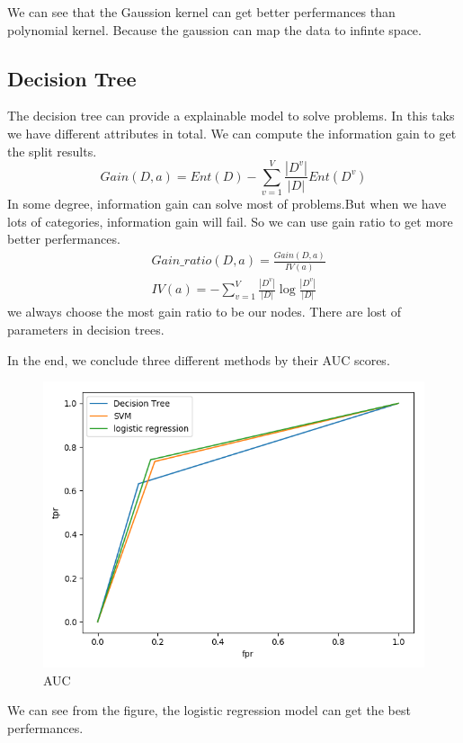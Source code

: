 We can see that the Gaussion kernel can get better perfermances than polynomial kernel. Because the gaussion can map the data to infinte space.

\subsection{Decision Tree}
The decision tree can provide a explainable model to solve problems. In this taks we have different attributes in total. We can compute the information gain to get the split results.
\begin{equation}
    Gain(D, a) = Ent(D) - \sum_{v=1}^{V} \frac{|D^v|}{|D|} Ent(D^v)
\end{equation}
In some degree, information gain can solve most of problems.But when we have lots of categories, information gain will fail. So we can use gain ratio to get more better perfermances.
\begin{align}
    &Gain\_ratio(D, a) = \frac{Gain(D,a)}{IV(a)}\\
    &IV(a) = -\sum_{v=1}^{V} \frac{|D^v|}{|D|} \log\frac{|D^v|}{|D|}
\end{align}
we always choose the most gain ratio to be our nodes. There are lost of parameters in decision trees.

In the end, we conclude three different  methods by their AUC scores.
\begin{figure}[ht]
    \centering
    \includegraphics[width=1\linewidth]{img/myplot.png}
    \caption{AUC}
\end{figure}

We can see from the figure, the logistic regression model can get the best perfermances. 